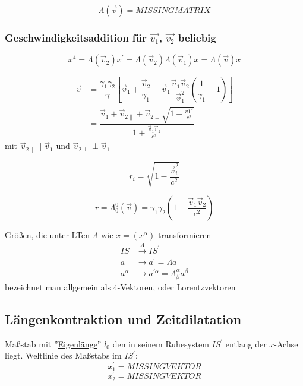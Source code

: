 \documentclass[a4paper, 11pt]{article}
\numberwithin{equation}{section}
\begin{document}
\begin{equation}
\Lambda(\vec{v}) = MISSINGMATRIX
\end{equation}

\subsubsection*{Geschwindigkeitsaddition für $\vec{v_1}$, $\vec{v_2}$ beliebig}

\begin{equation*}
x^4 = \Lambda(\vec{v}_2)x^\prime = \Lambda(\vec{v}_2) \Lambda(\vec{v}_1) x = \Lambda(\vec{v})x
\end{equation*}

\begin{equation*}
\begin{aligned}
\vec{v} &= \dfrac{\gamma_1 \gamma_2}{\gamma} \left[ \vec{v}_1 + \dfrac{\vec{v}_2}{\gamma_1} - \vec{v}_1  \dfrac{\vec{v}_1 \vec{v}_2}{\vec{v}_1^2} \left( \dfrac{1}{\gamma_1} -1 \right) \right] \\
&= \dfrac{\vec{v}_1+ \vec{v}_{2 \parallel}+\vec{v}_{2\perp}\sqrt{1-\frac{v1^2}{c^2}}}{1+\frac{\vec{v}_1\vec{v}_2}{c^2}}
\end{aligned}
\end{equation*}
mit $\vec{v}_{2\parallel} \parallel \vec{v}_1$ und $\vec{v}_{2\perp} \perp \vec{v}_1$

\begin{equation*}
r_i = \sqrt{1-\frac{\vec{v}_i^2}{c^2}}
\end{equation*}

\begin{equation}
r = \Lambda^0_0(\vec{v}) = \gamma_1\gamma_2 \left(1+ \frac{\vec{v}_1 \vec{v}_2}{c^2} \right)
\end{equation}




Größen, die unter LTen $\Lambda$ wie $x=(x^\alpha)$ transformieren
\begin{align*}
IS &\xrightarrow{\Lambda} IS^\prime \\
a &\rightarrow a^\prime = \Lambda a \\
a ^\alpha &\rightarrow a^{\prime \alpha} = \Lambda^\alpha_\beta a ^\beta
\end{align*}
bezeichnet man allgemein als 4-Vektoren, oder Lorentzvektoren

\subsection*{Längenkontraktion und Zeitdilatation}
Maßstab mit ''\underline{Eigenlänge}'' $l_0$ den in seinem Ruhesystem $IS^\prime$ entlang der $x$-Achse liegt. Weltlinie des Maßstabs im $IS^\prime$:
\begin{equation*}
x_1^\prime = MISSINGVEKTOR
\end{equation*}
\begin{equation*}
x_2^\prime = MISSINGVEKTOR
\end{equation*}
\end{document}
